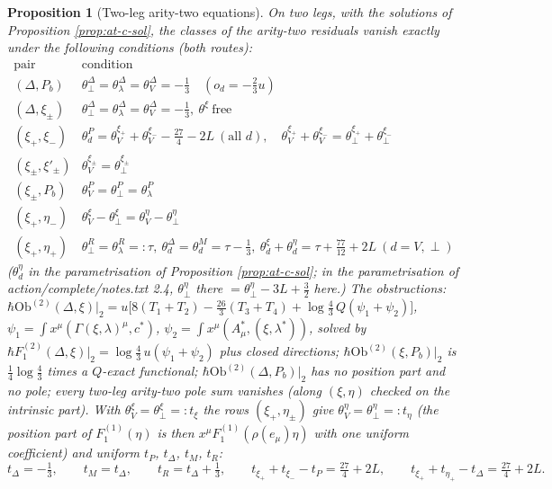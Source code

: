 \documentclass[11pt]{article}
\numberwithin{equation}{section}
\theoremstyle{plain}
\newtheorem{proposition}[theorem]{Proposition}
\theoremstyle{definition}
\newcommand{\Ob}{\mathrm{Ob}}
\begin{document}
\begin{proposition}[Two-leg arity-two equations]
\label{prop:at-c-ar2}
On two legs, with the solutions of Proposition \ref{prop:at-c-sol}, the classes of the arity-two residuals vanish exactly under the following conditions (both routes):
\[
\begin{array}{l|l}
\text{pair} & \text{condition}\\
\hline
(\Delta,P_b) & \theta^\Delta_\perp=\theta^\Delta_\lambda=\theta^\Delta_V=-\tfrac13\quad(o_d=-\tfrac23u)\\
(\Delta,\xi_\pm) & \theta^\Delta_\perp=\theta^\Delta_\lambda=\theta^\Delta_V=-\tfrac13,\ \theta^\xi\ \text{free}\\
(\xi_+,\xi_-) & \theta^P_d=\theta^{\xi_+}_V+\theta^{\xi_-}_V-\tfrac{27}4-2L\ (\text{all }d),\quad \theta^{\xi_+}_V+\theta^{\xi_-}_V=\theta^{\xi_+}_\perp+\theta^{\xi_-}_\perp\\
(\xi_\pm,\xi'_\pm) & \theta^{\xi_\pm}_V=\theta^{\xi_\pm}_\perp\\
(\xi_\pm,P_b) & \theta^P_V=\theta^P_\perp=\theta^P_\lambda\\
(\xi_+,\eta_-) & \theta^\xi_V-\theta^\xi_\perp=\theta^\eta_V-\theta^\eta_\perp\\
(\xi_+,\eta_+) & \theta^R_\perp=\theta^R_\lambda=:\tau,\ \theta^\Delta_d=\theta^M_d=\tau-\tfrac13,\ \theta^\xi_d+\theta^\eta_d=\tau+\tfrac{77}{12}+2L\ (d=V,\perp)
\end{array}
\]
($\theta^\eta_d$ in the parametrisation of Proposition \ref{prop:at-c-sol}; in the parametrisation of action/complete/notes.txt 2.4, $\theta^\eta_\perp$ there $=\theta^\eta_\perp-3L+\tfrac32$ here.)
The obstructions: $\hbar\Ob^{(2)}(\Delta,\xi)|_2=u\big[8(T_1+T_2)-\tfrac{26}3(T_3+T_4)+\log\tfrac43\,Q(\psi_1+\psi_2)\big]$, $\psi_1=\int x^\mu(\Gamma(\xi,\lambda)^\mu,c^*)$, $\psi_2=\int x^\mu(A^*_\mu,(\xi,\lambda^*))$, solved by $\hbar F_1^{(2)}(\Delta,\xi)|_2=\log\tfrac43\,u(\psi_1+\psi_2)$ plus closed directions; $\hbar\Ob^{(2)}(\xi,P_b)|_2$ is $\tfrac14\log\tfrac43$ times a $Q$-exact functional; $\hbar\Ob^{(2)}(\Delta,P_b)|_2$ has no position part and no pole; every two-leg arity-two pole sum vanishes (along $(\xi,\eta)$ checked on the intrinsic part). With $\theta^\xi_V=\theta^\xi_\perp=:t_\xi$ the rows $(\xi_+,\eta_\pm)$ give $\theta^\eta_V=\theta^\eta_\perp=:t_\eta$ (the position part of $F_1^{(1)}(\eta)$ is then $x^\mu F_1^{(1)}(\rho(e_\mu)\eta)$ with one uniform coefficient) and uniform $t_P$, $t_\Delta$, $t_M$, $t_R$:
\[
t_\Delta=-\tfrac13,\qquad t_M=t_\Delta,\qquad t_R=t_\Delta+\tfrac13,\qquad t_{\xi_+}+t_{\xi_-}-t_P=\tfrac{27}4+2L,\qquad t_{\xi_+}+t_{\eta_+}-t_\Delta=\tfrac{27}4+2L .
\]
\end{proposition}
\end{document}
